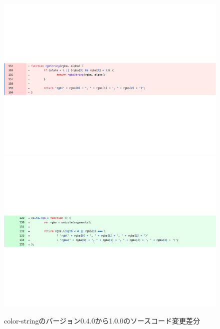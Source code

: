 \documentclass[11pt,dvipdfmx]{jreport}
\begin{document}
\begin{figure}[t]
  \centering
  \includegraphics[width=1.0\linewidth]{fig/rq1/rgb/rgb-src.pdf}
  \includegraphics[width=1.0\linewidth]{fig/rq1/rgb/rgb-src-1.pdf}
  \caption{color-stringのバージョン0.4.0から1.0.0のソースコード変更差分}
  \label{fig:rq1.change-test-input-src}
\end{figure}
\end{document}
